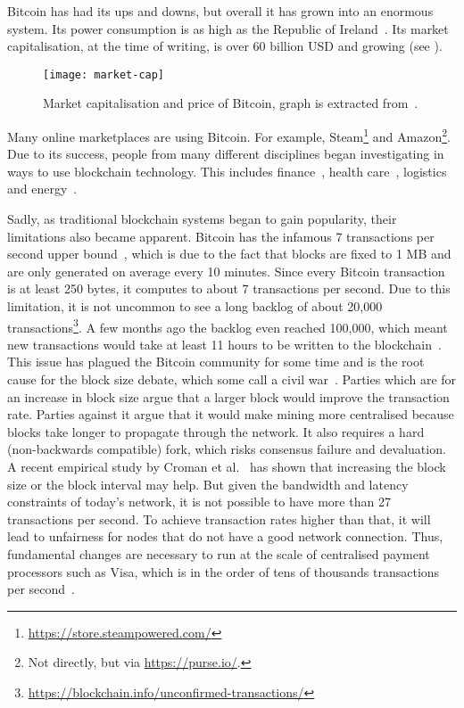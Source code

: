 Bitcoin has had its ups and downs, but overall it has grown into an enormous system.
Its power consumption is as high as the Republic of Ireland~\cite{o2014bitcoin}.
Its market capitalisation, at the time of writing, is over 60 billion USD and growing (see ).
\begin{figure}[h]
\centering
\texttt{[image: market-cap]}
\caption{Market capitalisation and price of Bitcoin, graph is extracted from~\cite{bitcoinmarketcap}.}
\label{fig:market-cap}
\end{figure}
Many online marketplaces are using Bitcoin.
For example, Steam\footnote{\url{https://store.steampowered.com/}} and Amazon\footnote{Not directly, but via \url{https://purse.io/}.}.
Due to its success, people from many different disciplines began investigating in ways to use blockchain technology.
This includes finance~\cite{finance}, health care~\cite{healthcare}, logistics~\cite{supplychain} and energy~\cite{energy}.

Sadly, as traditional blockchain systems began to gain popularity,
their limitations also became apparent.
Bitcoin has the infamous 7 transactions per second upper bound~\cite{vukolic2015quest}, 
which is due to the fact that blocks are fixed to 1 MB and are only generated on average every 10 minutes.
Since every Bitcoin transaction is at least 250 bytes, it computes to about 7 transactions per second.
Due to this limitation, it is not uncommon to see a long backlog of about 20,000 transactions\footnote{\url{https://blockchain.info/unconfirmed-transactions/}}.
A few months ago the backlog even reached 100,000, which meant new transactions would take at least 11 hours to be written to the blockchain~\cite{bitcoinbacklog}.
This issue has plagued the Bitcoin community for some time and is the root cause for the block size debate, which some call a civil war~\cite{bitcoincivilwar}.
Parties which are for an increase in block size argue that a larger block would improve the transaction rate.
Parties against it argue that it would make mining more centralised because blocks take longer to propagate through the network.
It also requires a hard (non-backwards compatible) fork,
which risks consensus failure and devaluation.
A recent empirical study by Croman et al.~\cite{croman2016scaling} has shown that increasing the block size or the block interval may help.
But given the bandwidth and latency constraints of today's network,
it is not possible to have more than 27 transactions per second.
To achieve transaction rates higher than that, it will lead to unfairness for nodes that do not have a good network connection.
Thus, fundamental changes are necessary to run at the scale of centralised payment processors such as Visa,
which is in the order of tens of thousands transactions per second~\cite{visa}.

